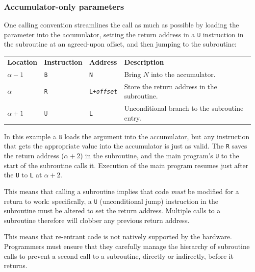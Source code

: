 \documentclass{article}
\begin{document}
\subsubsection*{Accumulator-only parameters}
One calling convention streamlines the call as much as possible by loading the parameter into the accumulator, setting the return address in a \texttt{U} instruction in the subroutine at an agreed-upon offset, and then jumping to the subroutine:
\begin{center}
\begin{tabular}{llll}
\textbf{Location} & \textbf{Instruction} & \textbf{Address} & \textbf{Description} \\
$\alpha-1$      & \texttt{B}            & \texttt{N}       & Bring $N$ into the accumulator. \\
$\alpha$      & \texttt{R}            & \texttt{L+\textit{offset}}    & Store the return address in the subroutine. \\
$\alpha+1$      & \texttt{U}            & \texttt{L}       & Unconditional branch to the subroutine entry. \\
\end{tabular}
\end{center}

In this example a \texttt{B} loads the argument into the accumulator, but any instruction that gets the appropriate value into the accumulator is just as valid. The \texttt{R} saves the return address ($\alpha+2$) in the subroutine, and the main program's \texttt{U} to the start of the subroutine calls it. Execution of the main program resumes just after the \texttt{U} to \texttt{L} at $\alpha+2$.

This means that calling a subroutine implies that code \emph{must} be modified for a return to work: specifically, a \texttt{U} (unconditional jump) instruction in the subroutine must be altered to set the return address. Multiple calls to a subroutine therefore will  clobber any previous return address.

This means that re-entrant code is not natively supported by the hardware. Programmers must ensure that they carefully manage the hierarchy of subroutine calls to prevent a second call to a subroutine, directly or indirectly, before it returns.
\end{document}

